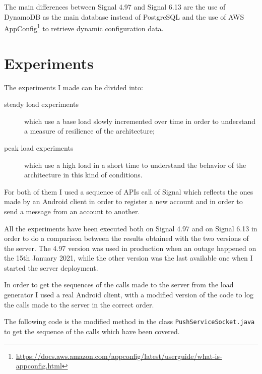 The main differences between Signal 4.97 and Signal 6.13 are the use of DynamoDB as the main database instead of PostgreSQL and the use of AWS AppConfig\footnote{\url{https://docs.aws.amazon.com/appconfig/latest/userguide/what-is-appconfig.html}} to retrieve dynamic configuration data.

\section{Experiments\label{sec:experiments}}

The experiments I made can be divided into:
\begin{description}
    \item[steady load experiments] which use a base load slowly incremented over time in order to understand a measure of resilience of the architecture;
    \item[peak load experiments] which use a high load in a short time to understand the behavior of the architecture in this kind of conditions.   
\end{description}

For both of them I used a sequence of APIs call of Signal which reflects the ones made by an Android client in order to register a new account and in order to send a message from an account to another.

All the experiments have been executed both on Signal 4.97 and on Signal 6.13 in order to do a comparison between the results obtained with the two versions of the server.
The 4.97 version was used in production when an outage happened on the 15th January 2021, while the other version was the last available one when I started the server deployment.

In order to get the sequences of the calls made to the server from the load generator I used a real Android client, with a modified version of the code to log the calls made to the server in the correct order.



The following code is the modified method in the class \texttt{PushServiceSocket.java} to get the sequence of the calls which have been covered.

